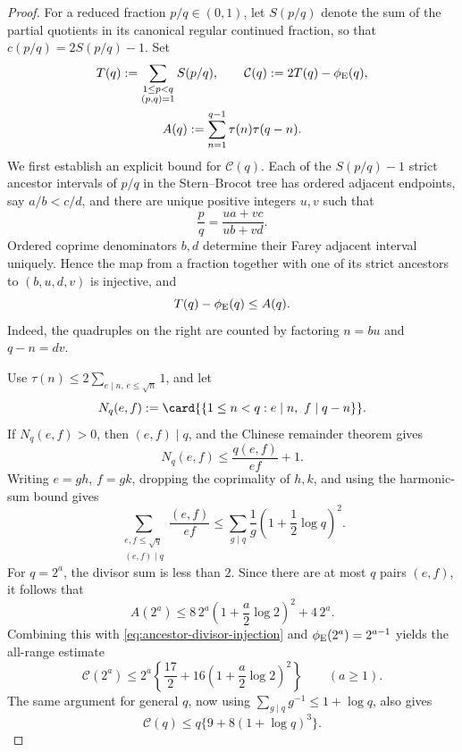 \begin{proof}
For a reduced fraction \(p/q\in(0,1)\), let \(S(p/q)\) denote the sum of the
partial quotients in its canonical regular continued fraction, so that
\(c(p/q)=2S(p/q)-1\).  Set
\[
 \begin{gathered}
  T(q):=\sum_{\substack{1\le p<q\\(p,q)=1}}S(p/q),
  \qquad
  \mathcal C(q):=2T(q)-\phi_{\rm E}(q),\\
  A(q):=\sum_{n=1}^{q-1}\tau(n)\tau(q-n).
 \end{gathered}
\]
We first establish an explicit bound for \(\mathcal C(q)\).  Each of the
\(S(p/q)-1\) strict ancestor intervals of \(p/q\) in the Stern--Brocot tree
has ordered adjacent endpoints, say \(a/b<c/d\), and there are unique
positive integers \(u,v\) such that
\[
 \frac pq=\frac{ua+vc}{ub+vd}.
\]
Ordered coprime denominators \(b,d\) determine their Farey adjacent interval
uniquely.  Hence the map from a fraction together with one of its strict
ancestors to \((b,u,d,v)\) is injective, and
\begin{equation}
 T(q)-\phi_{\rm E}(q)\le A(q).
 \label{eq:ancestor-divisor-injection}
\end{equation}
Indeed, the quadruples on the right are counted by factoring
\(n=bu\) and \(q-n=dv\).

Use
\(\tau(n)\le2\sum_{e\mid n,\,e\le\sqrt n}1\), and let
\[
 N_q(e,f):=\card{\{1\le n<q:e\mid n,\ f\mid q-n\}}.
\]
If \(N_q(e,f)>0\), then \((e,f)\mid q\), and the Chinese remainder theorem
gives
\[
 N_q(e,f)\le\frac{q(e,f)}{ef}+1.
\]
Writing \(e=gh\), \(f=gk\), dropping the coprimality of \(h,k\), and using
the harmonic-sum bound gives
\[
 \sum_{\substack{e,f\le\sqrt q\\(e,f)\mid q}}
 \frac{(e,f)}{ef}
 \le\sum_{g\mid q}\frac1g
       \left(1+\frac12\log q\right)^2.
\]
For \(q=2^a\), the divisor sum is less than \(2\).  Since there are at most
\(q\) pairs \((e,f)\), it follows that
\[
 A(2^a)\le8\,2^a\left(1+\frac a2\log2\right)^2+4\,2^a.
\]
Combining this with \eqref{eq:ancestor-divisor-injection} and
\(\phi_{\rm E}(2^a)=2^{a-1}\) yields the all-range estimate
\begin{equation}
 \mathcal C(2^a)
 \le2^a\left\{\frac{17}{2}
       +16\left(1+\frac a2\log2\right)^2\right\}
 \qquad(a\ge1).
 \label{eq:dyadic-cost-sum-bound}
\end{equation}
The same argument for general \(q\), now using
\(\sum_{g\mid q}g^{-1}\le1+\log q\), also gives
\begin{equation}
 \mathcal C(q)\le q\{9+8(1+\log q)^3\}.
 \label{eq:general-cost-sum-bound}
\end{equation}


\end{proof}

